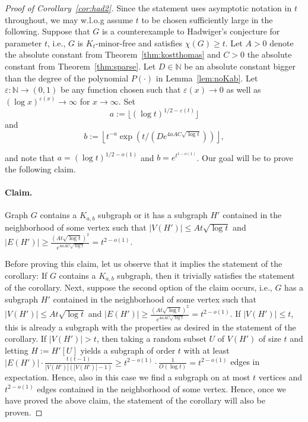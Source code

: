 \documentclass[10pt]{amsart}
\theoremstyle{definition}
\begin{document}
\begin{proof}[Proof of Corollary~\ref{cor:had2}]
Since the statement uses asymptotic notation in $t$ throughout, we may w.l.o.g assume $t$ to be chosen sufficiently large in the following. Suppose that $G$ is a counterexample to Hadwiger's conjecture for parameter $t$, i.e., $G$ is $K_t$-minor-free and satisfies $\chi(G)\ge t$. Let $A>0$ denote the absolute constant from Theorem~\ref{thm:kostthomas} and $C>0$ the absolute constant from Theorem~\ref{thm:sparse}. Let $D\in \mathbb{N}$ be an absolute constant bigger than the degree of the polynomial $P(\cdot)$ in Lemma~\ref{lem:noKab}. Let $\varepsilon:\mathbb{N}\rightarrow (0,1)$ be any function chosen such that $\varepsilon(x)\rightarrow 0$ as well as $(\log x)^{\varepsilon(x)}\rightarrow \infty$ for $x\rightarrow \infty$. Set $$a:=\lfloor (\log t)^{1/2-\varepsilon(t)} \rfloor$$ and $$b:=\left\lfloor t^{-a}\exp\left(t/(De^{4aAC\sqrt{\log t}})\right)\right\rfloor,$$

and note that $a=(\log t)^{1/2-o(1)}$ and $b=e^{t^{1-o(1)}}$. Our goal will be to prove the following claim.

\medskip

\paragraph*{\textbf{Claim.}} Graph $G$ contains a $K_{a,b}$ subgraph or it has a subgraph $H'$ contained in the neighborhood of some vertex such that $|V(H')|\le At\sqrt{\log t}$ and $|E(H')|\ge \frac{ (At\sqrt{\log t})^2}{e^{4aAC\sqrt{\log t}}}=t^{2-o(1)}$.

\medskip

Before proving this claim, let us observe that it implies the statement of the corollary: If $G$ contains a $K_{a,b}$ subgraph, then it trivially satisfies the statement of the corollary. Next, suppose the second option of the claim occurs, i.e., $G$ has a subgraph $H'$ contained in the neighborhood of some vertex such that $|V(H')|\le At\sqrt{\log t}$ and $|E(H')|\ge \frac{ (At\sqrt{\log t})^2}{e^{4aAC\sqrt{\log t}}}=t^{2-o(1)}$. If $|V(H')|\le t$, this is already a subgraph with the properties as desired in the statement of the corollary. If $|V(H')|>t$, then taking a random subset $U$ of $V(H')$ of size $t$ and letting $H:=H'[U]$ yields a subgraph of order $t$ with at least $|E(H')|\cdot \frac{t(t-1)}{|V(H')|(|V(H')|-1)}\ge t^{2-o(1)}\cdot \frac{1}{O(\log t)}=t^{2-o(1)}$ edges in expectation. Hence, also in this case we find a subgraph on at most $t$ vertices and $t^{2-o(1)}$ edges contained in the neighborhood of some vertex. Hence, once we have proved the above claim, the statement of the corollary will also be proven.


\end{proof}
\end{document}
